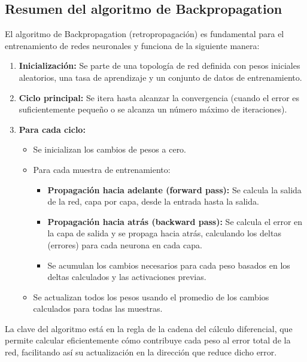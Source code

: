 \subsection{Resumen del algoritmo de Backpropagation}

El algoritmo de Backpropagation (retropropagación) es fundamental para el entrenamiento de redes neuronales y funciona de la siguiente manera:

\begin{enumerate}
    \item \textbf{Inicialización:} Se parte de una topología de red definida con pesos iniciales aleatorios, una tasa de aprendizaje y un conjunto de datos de entrenamiento.
    
    \item \textbf{Ciclo principal:} Se itera hasta alcanzar la convergencia (cuando el error es suficientemente pequeño o se alcanza un número máximo de iteraciones).
    
    \item \textbf{Para cada ciclo:}
    \begin{itemize}
        \item Se inicializan los cambios de pesos a cero.
        \item Para cada muestra de entrenamiento:
        \begin{itemize}
            \item \textbf{Propagación hacia adelante (forward pass):} Se calcula la salida de la red, capa por capa, desde la entrada hasta la salida.
            \item \textbf{Propagación hacia atrás (backward pass):} Se calcula el error en la capa de salida y se propaga hacia atrás, calculando los deltas (errores) para cada neurona en cada capa.
            \item Se acumulan los cambios necesarios para cada peso basados en los deltas calculados y las activaciones previas.
        \end{itemize}
        \item Se actualizan todos los pesos usando el promedio de los cambios calculados para todas las muestras.
    \end{itemize}
\end{enumerate}

La clave del algoritmo está en la regla de la cadena del cálculo diferencial, que permite calcular eficientemente cómo contribuye cada peso al error total de la red, facilitando así su actualización en la dirección que reduce dicho error.


